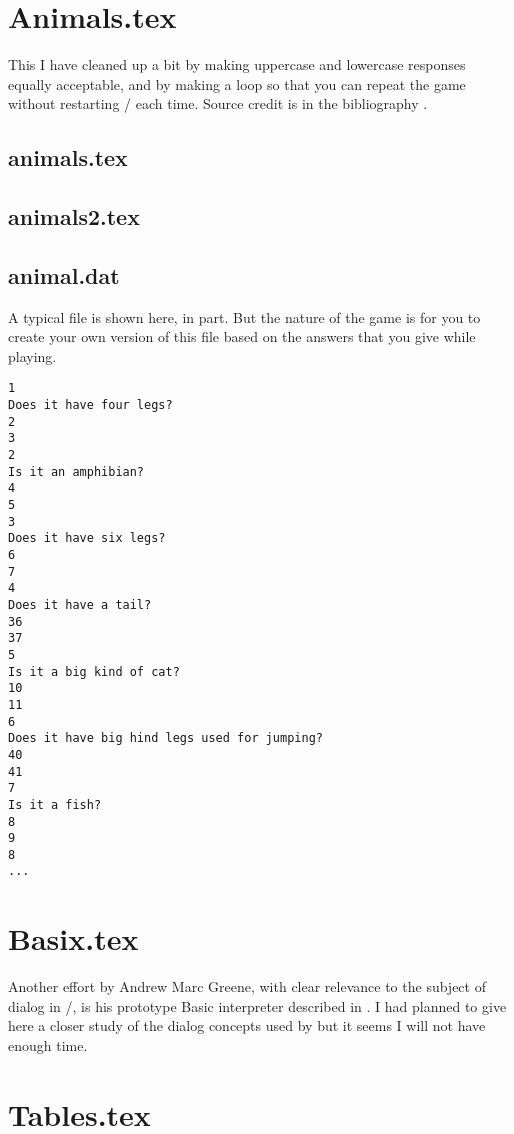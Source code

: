 {\begin{thebibliography}{x}
\end{thebibliography}

\appendix
\renewcommand{\thesection}{Appendix \Alph{section}}
\renewcommand{\thesubsection}{\Alph{section}.\arabic{subsection}}

\section{Animals.tex}
This I have cleaned up a bit by making uppercase and lowercase
responses equally acceptable, and by making a loop so that
you can repeat the game without restarting \tex/ each time.
Source credit is in the bibliography \cite{animals}.

\subsection{animals.tex}


\subsection{animals2.tex}



\subsection{animal.dat}
A typical file  is shown here, in part. But the nature
of the game is for you to create your own version of this file based
on the answers that you give while playing.
\begin{verbatim}
1
Does it have four legs?
2
3
2
Is it an amphibian?
4
5
3
Does it have six legs?
6
7
4
Does it have a tail?
36
37
5
Is it a big kind of cat?
10
11
6
Does it have big hind legs used for jumping?
40
41
7
Is it a fish?
8
9
8
...
\end{verbatim}

\section{Basix.tex}

Another effort by Andrew Marc Greene, with clear relevance to the
subject of dialog in \tex/, is his prototype Basic interpreter
described in \cite{basix}. I had planned to give here a closer study
of the dialog concepts used by  but it seems I will not
have enough time.

\section{Tables.tex}

}
